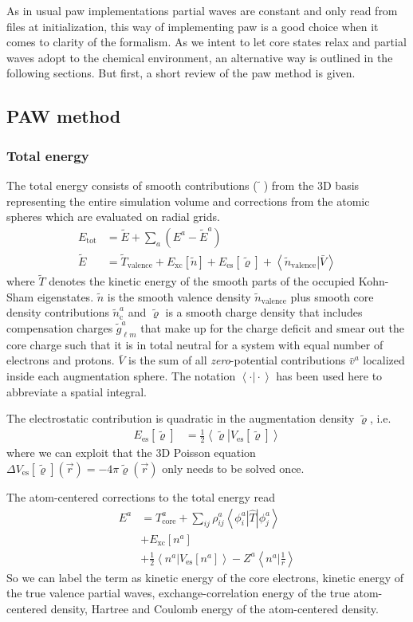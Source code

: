 \documentclass[oribibl]{llncs}
\newcommand{\um}[1]{_{\mathrm{#1}}}
\newcommand{\braket}[2]{\left\langle \left. #1 \right| #2 \right\rangle}
\newcommand{\braketop}[3]{\left\langle \left. #1 \right| #2 \left| #3 \right. \right\rangle}
\begin{document}
As in usual \ac{paw} implementations partial waves are constant 
and only read from files at initialization, this way of implementing \ac{paw}
is a good choice when it comes to clarity of the formalism.
As we intent to let core states relax and partial waves adopt
to the chemical environment,
an alternative way is outlined in the following sections.
But first, a short review of the \ac{paw} method is given.

\subsection{PAW method}
%
\subsubsection{Total energy}
%
The total energy consists of smooth contributions ($\tilde{\phantom{x}}$) from the 3D basis
representing the entire simulation volume and corrections from the atomic spheres
which are evaluated on radial grids.
\begin{align}
	E\um{tot} &= \tilde E + \sum_a \left( E^a - \tilde E^a \right) \\
	\tilde E  &= \tilde T\um{valence} + E\um{xc}[\tilde n] + E\um{es}[\tilde\varrho] + \braket{\tilde n\um{valence}}{\bar V}
\end{align}
where $\tilde T$ denotes the kinetic energy of the smooth parts of the occupied Kohn-Sham eigenstates.
$\tilde n$ is the smooth valence density $\tilde n\um{valence}$ plus smooth core density contributions $\tilde n^a\um{c}$
and $\tilde\varrho$ is a smooth charge density that includes compensation charges $\tilde g_{\ell m}^a$
that make up for the charge deficit and smear out the core charge such that it is in total neutral
for a system with equal number of electrons and protons.
$\bar{V}$ is the sum of all \emph{zero}-potential contributions $\bar v^a$ localized inside
each augmentation sphere. The notation $\braket{\cdot}{\cdot}$ has been used here to 
abbreviate a spatial integral.

The electrostatic contribution is quadratic in the augmentation density $\tilde\varrho$, 
i.e.~
\begin{align}
E\um{es}[\tilde\varrho] &= \frac{1}{2} \braket{\tilde\varrho}{V\um{es}[\tilde\varrho]}
\end{align}
where we can exploit that the 3D Poisson equation $\Delta V\um{es}[\tilde\varrho](\vec r) = -4\pi\tilde\varrho(\vec r)$ only needs to be solved once.

The atom-centered corrections to the total energy read
\begin{align}
  E^a &= T^a\um{core} + \sum_{ij} \rho^a_{ij} \braketop{\phi^a_i}{\hat T}{\phi^a_j} \\
      &+ E\um{xc}[n^a] \\
      &+ \frac{1}{2} \braket{ n^a }{ V\um{es}[n^a] } - Z^a \braket{ n^a }{ \frac{1}{r} } 
      \label{eqn:total-energy-true-atom-corrections}
\end{align}
So we can label the term as kinetic energy of the core electrons, 
kinetic energy of the true valence partial waves,
exchange-correlation energy of the true atom-centered density,
Hartree and Coulomb energy of the atom-centered density.
\end{document}
